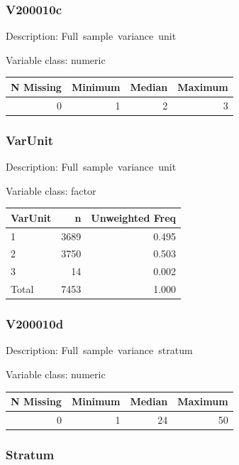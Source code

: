 \documentclass[
]{krantz}
\begin{document}
\hypertarget{v200010c}{%
\subsubsection*{V200010c}\label{v200010c}}


Description: Full~sample~variance~unit

Variable class: numeric

\begin{tabular}[t]{r|r|r|r}
\hline
N Missing & Minimum & Median & Maximum\\
\hline
0 & 1 & 2 & 3\\
\hline
\end{tabular}

\hypertarget{varunit}{%
\subsubsection*{VarUnit}\label{varunit}}


Description: Full~sample~variance~unit

Variable class: factor

\begin{tabular}[t]{l|r|r}
\hline
VarUnit & n & Unweighted Freq\\
\hline
1 & 3689 & 0.495\\
\hline
2 & 3750 & 0.503\\
\hline
3 & 14 & 0.002\\
\hline
Total & 7453 & 1.000\\
\hline
\end{tabular}

\hypertarget{v200010d}{%
\subsubsection*{V200010d}\label{v200010d}}


Description: Full~sample~variance~stratum

Variable class: numeric

\begin{tabular}[t]{r|r|r|r}
\hline
N Missing & Minimum & Median & Maximum\\
\hline
0 & 1 & 24 & 50\\
\hline
\end{tabular}

\hypertarget{stratum}{%
\subsubsection*{Stratum}\label{stratum}}
\end{document}
